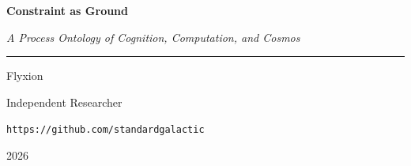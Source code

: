 \begin{titlepage}
\thispagestyle{empty}
\null
\vfill

\begin{center}

{\Large\bfseries Constraint as Ground}

\vspace{0.8cm}
{\large\itshape A Process Ontology of Cognition, Computation, and Cosmos}

\vspace{3cm}
\rule{0.38\textwidth}{0.4pt}

\vspace{3cm}
{\large Flyxion}

\vspace{0.4cm}
{\small Independent Researcher}

\vspace{0.4cm}
{\small\texttt{https://github.com/standardgalactic}}

\end{center}

\vfill

\begin{center}
{\small 2026}
\end{center}

\end{titlepage}
